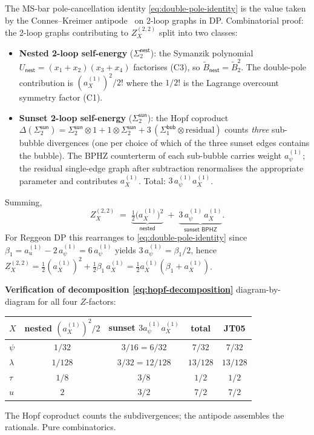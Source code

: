 \documentclass[11pt,a4paper]{article}
\theoremstyle{definition}
\theoremstyle{plain}
\begin{document}
\begin{acbox}
The MS-bar pole-cancellation identity \eqref{eq:double-pole-identity}
is the value taken by the Connes--Kreimer
antipode~\cite{ConnesKreimer1998,Kreimer1997} on 2-loop graphs in DP.
Combinatorial proof: the 2-loop graphs contributing to $Z_X^{(2,2)}$
split into two classes:
\begin{itemize}[leftmargin=2em]
  \item \textbf{Nested 2-loop self-energy} ($\Sigma_2^{\textsf{nest}}$):
    the Symanzik polynomial $U_{\textsf{nest}}=(x_1+x_2)(x_3+x_4)$
    factorises (\textsf{C3}), so $\tilde B_{\textsf{nest}} =
    \tilde B_2^2$.  The double-pole contribution is
    $(a_X^{(1)})^2 / 2!$ where the $1/2!$ is the Lagrange overcount
    symmetry factor (\textsf{C1}).
  \item \textbf{Sunset 2-loop self-energy} ($\Sigma_2^{\textsf{sun}}$):
    the Hopf coproduct $\Delta(\Sigma_2^{\textsf{sun}}) =
    \Sigma_2^{\textsf{sun}}\otimes 1 + 1\otimes\Sigma_2^{\textsf{sun}}
    + 3\,(\Sigma_1^{\textsf{bub}}\otimes \text{residual})$
    counts \emph{three} sub-bubble divergences (one per choice of
    which of the three sunset edges contains the bubble).  The
    BPHZ counterterm of each sub-bubble carries weight $a_\psi^{(1)}$;
    the residual single-edge graph after subtraction renormalises
    the appropriate parameter and contributes $a_X^{(1)}$.  Total:
    $3\,a_\psi^{(1)} a_X^{(1)}$.
\end{itemize}
Summing,
\begin{equation}\label{eq:hopf-decomposition}
  Z_X^{(2,2)} \;=\;
  \underbrace{\tfrac{1}{2}\bigl(a_X^{(1)}\bigr)^2}_{\textsf{nested}}
  \;+\;
  \underbrace{3\,a_\psi^{(1)}\,a_X^{(1)}}_{\textsf{sunset BPHZ}}.
\end{equation}
For Reggeon DP this rearranges to \eqref{eq:double-pole-identity}
since $\beta_1 = a_u^{(1)} - 2\,a_\psi^{(1)} = 6\,a_\psi^{(1)}$
yields $3\,a_\psi^{(1)} = \beta_1/2$, hence $Z_X^{(2,2)} =
\tfrac{1}{2}(a_X^{(1)})^2 + \tfrac{1}{2}\beta_1\,a_X^{(1)} =
\tfrac{1}{2}a_X^{(1)}(\beta_1 + a_X^{(1)})$.

\textbf{Verification of decomposition \eqref{eq:hopf-decomposition}}
diagram-by-diagram for all four $Z$-factors:
\begin{center}\small
\begin{tabular}{@{}lcccc@{}}
\toprule
$X$ & nested $(a_X^{(1)})^2/2$ & sunset $3 a_\psi^{(1)} a_X^{(1)}$
    & total & JT05 \\
\midrule
$\psi$    & $1/32$  & $3/16 = 6/32$    & $7/32$    & $7/32$\\
$\lambda$ & $1/128$ & $3/32 = 12/128$  & $13/128$  & $13/128$\\
$\tau$    & $1/8$   & $3/8$            & $1/2$     & $1/2$\\
$u$       & $2$     & $3/2$            & $7/2$     & $7/2$\\
\bottomrule
\end{tabular}
\end{center}
The Hopf coproduct counts the subdivergences; the antipode assembles
the rationals.  Pure combinatorics.
\end{acbox}
\end{document}
